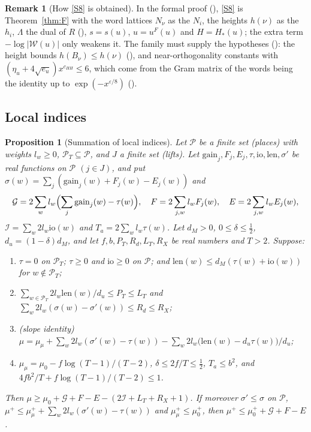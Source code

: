 \documentclass[11pt]{amsart}
\newcommand{\eps}{\varepsilon}
\theoremstyle{plain}
\newtheorem{proposition}[theorem]{Proposition}
\theoremstyle{definition}
\newtheorem{remark}[theorem]{Remark}
\numberwithin{equation}{section}
\begin{document}
\begin{remark}[How \ref{S8} is obtained]\label{rem:S8}
In the formal proof (), \ref{S8} is Theorem~\ref{thm:F} with the word
lattices $N_\nu$ as the $N_i$, the heights $h(\nu)$ as the $h_i$, $\Lambda$ the dual of $R$
(), $s=s(u)$, $u=u^F(u)$ and $H=H_\ast(u)$; the extra term $-\log|\mathcal W(u)|$ only
weakens it. The family must supply the hypotheses (): the height bounds
$h(B_\nu)\le h(\nu)$ (), and near-orthogonality constants with
$(\eta_u+4\sqrt{e_u})x^{c_{HH}}\le6$, which come from the Gram matrix of the words being the
identity up to $\exp(-x^{\eps/8})$ ().
\end{remark}

\subsection{Local indices}

\begin{proposition}[Summation of local indices]\label{prop:localindex}
Let $\mathcal P$ be a finite set (places) with weights $l_w\ge0$, $\mathcal P_T\subseteq\mathcal P$, and $J$
a finite set (lifts). Let $\mathrm{gain}_j,F_j,E_j,\tau,\mathrm{io},\mathrm{len},\sigma'$ be real
functions on $\mathcal P$ $(j\in J)$, and put
$\sigma(w)=\sum_j(\mathrm{gain}_j(w)+F_j(w)-E_j(w))$ and
\[
\mathcal G=2\sum_wl_w\Bigl(\sum_j\mathrm{gain}_j(w)-\tau(w)\Bigr),\quad F=2\sum_{j,w}l_wF_j(w),\quad E=2\sum_{j,w}l_wE_j(w),
\]
$\mathcal I=\sum_w2l_w\mathrm{io}(w)$ and $T_a=2\sum_wl_w\tau(w)$. Let $d_M>0$, $0\le\delta\le\frac12$,
$d_u=(1-\delta)d_M$, and let $f,b,P_T,R_d,L_T,R_X$ be real numbers and $T>2$. Suppose:
\begin{enumerate}[label=\textup{(L\arabic*)}]
\item $\tau=0$ on $\mathcal P_T$; $\tau\ge0$ and $\mathrm{io}\ge0$ on $\mathcal P$; and
  $\mathrm{len}(w)\le d_M(\tau(w)+\mathrm{io}(w))$ for $w\notin\mathcal P_T$;
\item $\sum_{w\in\mathcal P_T}2l_w\mathrm{len}(w)/d_u\le P_T\le L_T$ and
  $\sum_w2l_w(\sigma(w)-\sigma'(w))\le R_d\le R_X$;
\item (slope identity)
  $\mu=\mu_\mu+\sum_w2l_w(\sigma'(w)-\tau(w))-\sum_w2l_w\bigl(\mathrm{len}(w)-d_u\tau(w)\bigr)/d_u$;
\item $\mu_\mu=\mu_0-f\log(T-1)/(T-2)$, $\delta\le2f/T\le\frac12$, $T_a\le b^2$, and
  $4fb^2/T+f\log(T-1)/(T-2)\le1$.
\end{enumerate}
Then $\mu\ge\mu_0+\mathcal G+F-E-(2\mathcal I+L_T+R_X+1)$. If moreover $\sigma'\le\sigma$ on $\mathcal P$,
$\mu^+\le\mu^+_\mu+\sum_w2l_w(\sigma'(w)-\tau(w))$ and $\mu^+_\mu\le\mu_0^+$, then
$\mu^+\le\mu_0^++\mathcal G+F-E$.
\end{proposition}
\end{document}
